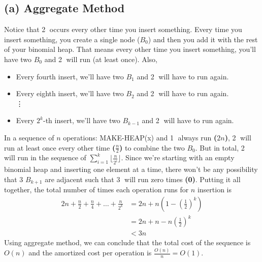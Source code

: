\documentclass{article}
\begin{document}
\subsection*{(a) Aggregate Method}
Notice that \textcircled{2} occurs every other time you insert something. Every time you insert something, you create a single node ($B_0$) and then you add it with the rest of your binomial heap. That means every other time you insert something, you'll have two $B_0$ and \textcircled{2} will run (at least once). Also, 
\begin{itemize}
    \item Every fourth insert, we'll have two $B_1$ and \textcircled{2} will have to run again.
    \item Every eighth insert, we'll have two $B_2$ and \textcircled{2} will have to run again. \\
    \vdots
    \item Every $2^k$-th insert, we'll have two $B_{k-1}$ and \textcircled{2} will have to run again.
\end{itemize}
In a sequence of $n$ operations: MAKE-HEAP(x) and \textcircled{1} always run \textbf{($2n$)}, \textcircled{2} will run at least once every other time \textbf{($\frac{n}{2}$)} to combine the two $B_0$. But in total, \textcircled{2} will run in the sequence of $\sum^{k}_{i=1} \lfloor \frac{n}{2^i} \rfloor$. Since we're starting with an empty binomial heap and inserting one element at a time, there won't be any possibility that 3 $B_{k+1}$ are adjacent such that \textcircled{3} will run zero times \textbf{(0)}. Putting it all together, the total number of times each operation runs for $n$ insertion is 
\begin{align*}
    2n + \frac{n}{2} + \frac{n}{4} + \dots + \frac{n}{2^k} &= 2n + n(1 - (\frac{1}{2})^k)\\
    &= 2n + n - n(\frac{1}{2})^k\\
    &< 3n
\end{align*}
Using aggregate method, we can conclude that the total cost of the sequence is $O(n)$ and the amortized cost per operation is $\frac{O(n)}{n}=O(1)$.

\newpage
\end{document}
